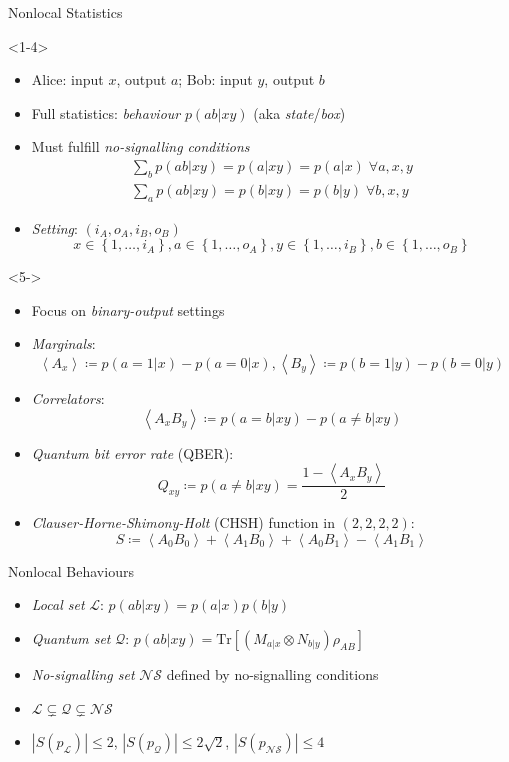 \documentclass[xcolor=dvipsnames]{beamer}
\newcommand{\?}{\mathrel{?}} %
\newcommand{\abs}[1]{\left\lvert#1\right\rvert} %
\newcommand{\dintv}[2]{\left\{#1,\ldots,#2\right\}}
\newcommand{\Tr}{\mathrm{Tr}} %
\newcommand{\angleb}[1]{\left\langle #1 \right\rangle} %
\newcommand{\Ls}{\mathcal{L}}
\newcommand{\Qs}{\mathcal{Q}}
\newcommand{\NSs}{\mathcal{NS}}
\begin{document}
\begin{frame}{Nonlocal Statistics}
  \begin{onlyenv}<1-4>
  \begin{itemize}[<+->]
    \item Alice: input \(x\), output \(a\); Bob: input \(y\), output \(b\)
    \item Full statistics: \emph{behaviour} \(p(ab|xy)\) (aka \emph{state}/\emph{box})
    \item Must fulfill \emph{no-signalling conditions}
      \begin{gather*}
        \sum_b p(ab|xy) = p(a|xy) = p(a|x)\;\forall a,x,y \\
        \sum_a p(ab|xy) = p(b|xy) = p(b|y)\;\forall b,x,y
      \end{gather*}
    \item \emph{Setting}: \((i_A, o_A, i_B, o_B)\)
    \[ x \in \dintv{1}{i_A}, a \in \dintv{1}{o_A}, y \in \dintv{1}{i_B}, b \in \dintv{1}{o_B} \]
  \end{itemize}
  \end{onlyenv}
  \begin{onlyenv}<5->
  \begin{itemize}[<+->]
    \item Focus on \emph{binary-output} settings
    \item \emph{Marginals}:
      \[ \angleb{A_x} \coloneqq p(a=1|x) - p(a=0|x), \angleb{B_y} \coloneqq p(b=1|y) - p(b=0|y) \]
    \item \emph{Correlators}:
      \[ \angleb{A_x B_y} \coloneqq p(a=b|xy) - p(a\neq b|xy) \]
    \item \emph{Quantum bit error rate} (QBER):
      \[ Q_{xy} \coloneqq p(a \neq b|xy) = \frac{1-\angleb{A_x B_y}}{2} \]
    \item \emph{Clauser-Horne-Shimony-Holt} (CHSH) function in \((2,2,2,2)\):
      \[ S \coloneqq \angleb{A_0 B_0} + \angleb{A_1 B_0} + \angleb{A_0 B_1} - \angleb{A_1 B_1} \]
  \end{itemize}
  \end{onlyenv}
\end{frame}

\begin{frame}{Nonlocal Behaviours}
  \begin{itemize}[<+->]
    \item \emph{Local set} \(\Ls\): \(p(ab|xy) = p(a|x)p(b|y)\)
    \item \emph{Quantum set} \(\Qs\): \(p(ab|xy) = \Tr\left[ \left(M_{a|x} \otimes N_{b|y}\right) \rho_{AB} \right]\)
    \item \emph{No-signalling set} \(\NSs\) defined by no-signalling conditions
    \item \(\Ls \subsetneq \Qs \subsetneq \NSs\)
    \item \(\abs{S(p_{\Ls})} \leq 2\), \(\abs{S(p_{\Qs})} \leq 2\sqrt{2}\), \(\abs{S(p_{\NSs})} \leq 4\)
  \end{itemize}
\end{frame}
\end{document}
